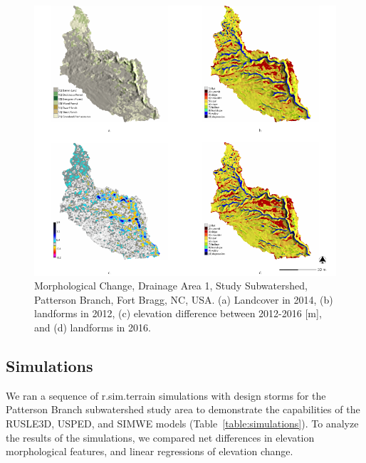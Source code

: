\documentclass[gmd, manuscript]{copernicus}
\begin{document}
\begin{figure}
\center
\includegraphics[width=\textwidth,height=0.95\textheight,keepaspectratio]{figures/study_area.pdf}
\caption{Morphological Change, Drainage Area 1, Study Subwatershed, Patterson Branch, Fort Bragg, NC, USA.
(a) Landcover in 2014, 
(b) landforms in 2012,
(c) elevation difference between 2012-2016 [m], and
(d) landforms in 2016.
}
\label{fig:study_area}
\end{figure}

\subsection{Simulations}
%
We ran a sequence of r.sim.terrain simulations 
with design storms
for the Patterson Branch subwatershed study area
to demonstrate the capabilities 
of the RUSLE3D, USPED, and SIMWE models
(Table~\ref{table:simulations}).
%
To analyze the results of the simulations,
we compared 
net differences in elevation
morphological features,
and linear regressions of elevation change.
\end{document}
